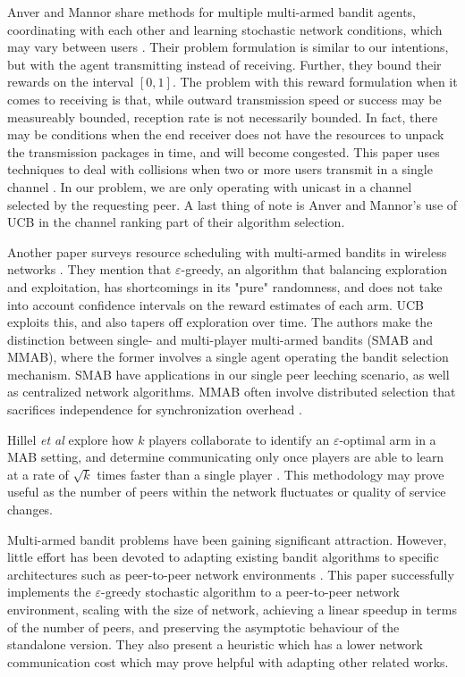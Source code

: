 \documentclass{article}
\begin{document}
Anver and Mannor share methods for multiple multi-armed bandit agents, coordinating with each other and learning stochastic network conditions, which may vary between 
users \cite{multiuser_mab}. Their problem formulation is similar to our intentions, but with the agent transmitting instead of receiving. Further, they bound their rewards 
on the interval $[0,1]$. The problem with this reward formulation when it comes to receiving is that, while outward transmission speed or success may be measureably bounded, 
reception rate is not necessarily bounded. In fact, there may be conditions when the end receiver does not have the resources to unpack the transmission packages in time, 
and will become congested. This paper uses techniques to deal with collisions when two or more users transmit in a single channel \cite{multiuser_mab}. In our problem, we 
are only operating with unicast in a channel selected by the requesting peer. A last thing of note is Anver and Mannor's use of UCB in the channel ranking part of their 
algorithm selection.

Another paper surveys resource scheduling with multi-armed bandits in wireless networks \cite{mab_wireless_scheduling_survey}. They mention that $\varepsilon$-greedy, an 
algorithm that balancing exploration and exploitation, has shortcomings in its "pure" randomness, and does not take into account confidence intervals on the reward estimates 
of each arm. UCB exploits this, and also tapers off exploration over time. The authors make the distinction between single- and multi-player multi-armed bandits (SMAB and 
MMAB), where the former involves a single agent operating the bandit selection mechanism. SMAB have applications in our single peer leeching scenario, as well as centralized 
network algorithms. MMAB often involve distributed selection that sacrifices independence for synchronization overhead \cite{mab_wireless_scheduling_survey}.

Hillel \textit{et al} explore how $k$ players collaborate to identify an $\varepsilon$-optimal arm in a MAB setting, and determine communicating only
once players are able to learn at a rate of $\sqrt{k}$ times faster than a single player \cite{mab_dist_exploration}. This methodology may prove useful as the number of 
peers within the network fluctuates or quality of service changes. 

Multi-armed bandit problems have been gaining significant attraction. However, little effort has been devoted to adapting existing bandit algorithms to specific architectures 
such as peer-to-peer network environments \cite{gossip_based_distrivuted_stochastic}. This paper successfully implements the $\varepsilon$-greedy stochastic algorithm to a 
peer-to-peer network environment, scaling with the size of network, achieving a linear speedup in terms of the number of peers, and preserving the asymptotic behaviour of the 
standalone version. They also present a heuristic which has a lower network communication cost which may prove helpful with adapting other related works. 
\end{document}
